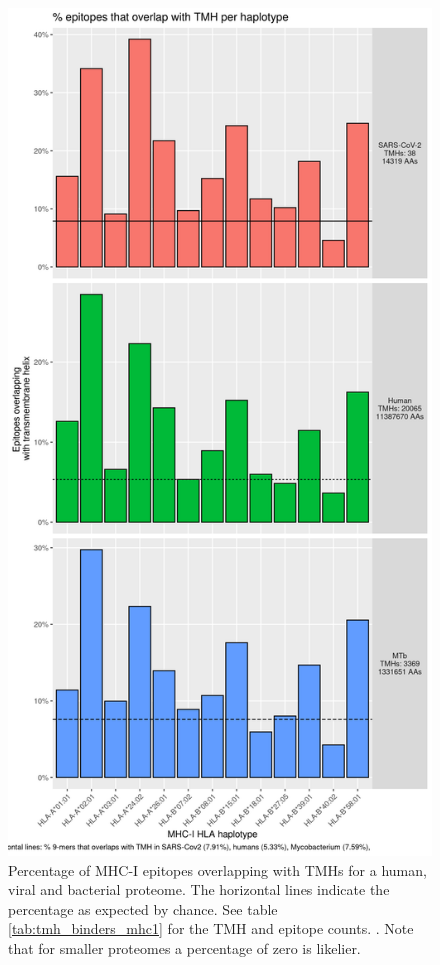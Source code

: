 \begin{figure}[!htbp]
  \includegraphics[height=0.9\textheight]{bbbq_1_smart_results/fig_f_tmh_mhc1_2_grid.png}
  \caption{
    Percentage of MHC-I epitopes overlapping with TMHs
    for a human, viral and bacterial proteome.
    The horizontal lines indicate the percentage as expected by chance.
    See table \ref{tab:tmh_binders_mhc1} for the TMH and epitope counts.
    .
    Note that for smaller proteomes a percentage of zero is likelier.
  }
  \label{fig:1}
\end{figure}

